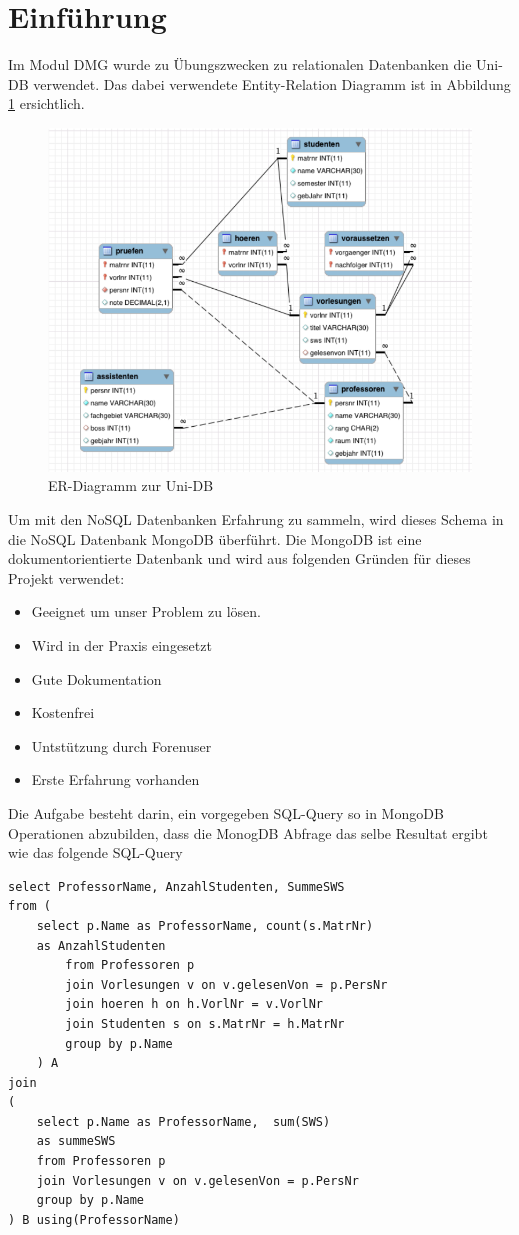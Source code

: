 \section{Einführung}
Im Modul DMG wurde zu Übungszwecken zu relationalen Datenbanken die Uni-DB 
verwendet. Das dabei verwendete Entity-Relation Diagramm ist in Abbildung
\ref{fig:uni-db} ersichtlich.
\begin{figure}[htbp] 
  \centering
     \includegraphics[width=1\textwidth]{./pictures/SQL-DB_ER_Diagramm_UNI-DB.png}
  \caption{ER-Diagramm zur Uni-DB \cite{Kaufmann2016_S1}}
  \label{fig:uni-db}
\end{figure}
 Um mit den NoSQL Datenbanken Erfahrung zu sammeln, wird dieses Schema in die NoSQL Datenbank MongoDB überführt.
Die MongoDB ist eine dokumentorientierte Datenbank und  wird aus folgenden
Gründen für dieses Projekt verwendet:
\begin{itemize}
  \item Geeignet um unser Problem zu lösen.
  \item Wird in der Praxis eingesetzt
  \item Gute Dokumentation
  \item Kostenfrei
  \item Untstützung durch Forenuser
  \item Erste Erfahrung vorhanden
\end{itemize}
Die Aufgabe besteht darin, ein vorgegeben SQL-Query so in MongoDB Operationen
abzubilden, dass die MonogDB Abfrage das selbe Resultat ergibt wie das folgende 
SQL-Query
\begin{lstlisting}
select ProfessorName, AnzahlStudenten, SummeSWS 
from ( 
	select p.Name as ProfessorName, count(s.MatrNr) 
	as AnzahlStudenten 
		from Professoren p 
		join Vorlesungen v on v.gelesenVon = p.PersNr
		join hoeren h on h.VorlNr = v.VorlNr 
		join Studenten s on s.MatrNr = h.MatrNr 
		group by p.Name 
	) A 
join 
( 
	select p.Name as ProfessorName,  sum(SWS) 
	as summeSWS 
	from Professoren p 
	join Vorlesungen v on v.gelesenVon = p.PersNr 
	group by p.Name 
) B using(ProfessorName)
\end{lstlisting}